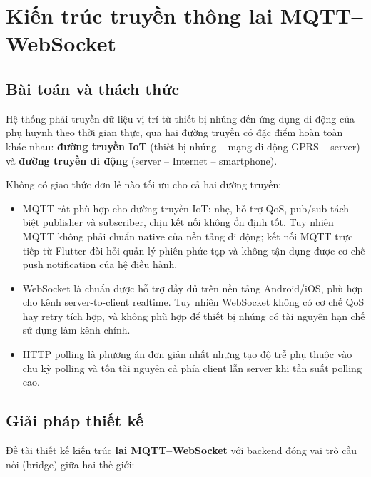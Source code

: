 \documentclass[../DoAn.tex]{subfiles}
\begin{document}
\section{Kiến trúc truyền thông lai MQTT–WebSocket}
\label{section:5.3}

\subsection{Bài toán và thách thức}

Hệ thống phải truyền dữ liệu vị trí từ thiết bị nhúng đến ứng dụng di động của phụ huynh theo thời gian thực, qua hai đường truyền có đặc điểm hoàn toàn khác nhau: \textbf{đường truyền IoT} (thiết bị nhúng – mạng di động GPRS – server) và \textbf{đường truyền di động} (server – Internet – smartphone).

Không có giao thức đơn lẻ nào tối ưu cho cả hai đường truyền:
\begin{itemize}
    \item MQTT rất phù hợp cho đường truyền IoT: nhẹ, hỗ trợ QoS, pub/sub tách biệt publisher và subscriber, chịu kết nối không ổn định tốt. Tuy nhiên MQTT không phải chuẩn native của nền tảng di động; kết nối MQTT trực tiếp từ Flutter đòi hỏi quản lý phiên phức tạp và không tận dụng được cơ chế push notification của hệ điều hành.
    \item WebSocket là chuẩn được hỗ trợ đầy đủ trên nền tảng Android/iOS, phù hợp cho kênh server-to-client realtime. Tuy nhiên WebSocket không có cơ chế QoS hay retry tích hợp, và không phù hợp để thiết bị nhúng có tài nguyên hạn chế sử dụng làm kênh chính.
    \item HTTP polling là phương án đơn giản nhất nhưng tạo độ trễ phụ thuộc vào chu kỳ polling và tốn tài nguyên cả phía client lẫn server khi tần suất polling cao.
\end{itemize}

\subsection{Giải pháp thiết kế}

Đề tài thiết kế kiến trúc \textbf{lai MQTT–WebSocket} với backend đóng vai trò cầu nối (bridge) giữa hai thế giới:
\end{document}
